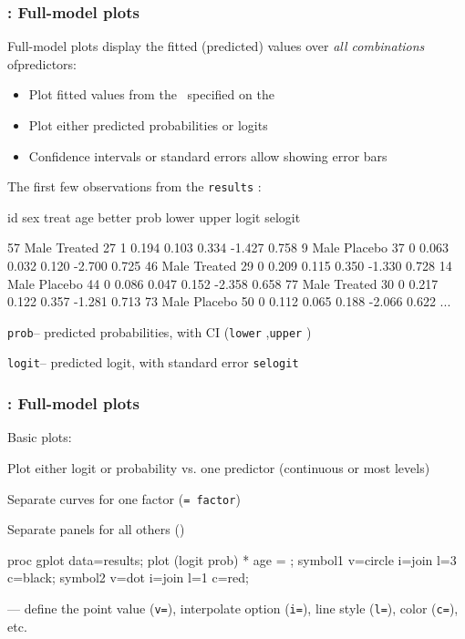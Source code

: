 \begin{frame}[fragile]
  \frametitle{: Full-model plots}
 \alert{Full-model plots} display the fitted (predicted) values over \emph{all combinations}  ofpredictors:
  \begin{itemize}
	\item Plot fitted values from the \Dset\ specified on the 
	\item Plot either predicted probabilities or logits
	\item Confidence intervals or standard errors allow showing error bars
  \end{itemize}
The first few observations from the \texttt{results} \Dset:
\begin{Output}[gobble=2,fontsize=\footnotesize]
   id sex   treat  age better   prob  lower  upper  logit selogit

   57 Male Treated  27    1    0.194  0.103  0.334 -1.427  0.758 
    9 Male Placebo  37    0    0.063  0.032  0.120 -2.700  0.725 
   46 Male Treated  29    0    0.209  0.115  0.350 -1.330  0.728 
   14 Male Placebo  44    0    0.086  0.047  0.152 -2.358  0.658 
   77 Male Treated  30    0    0.217  0.122  0.357 -1.281  0.713 
   73 Male Placebo  50    0    0.112  0.065  0.188 -2.066  0.622 
    ...
\end{Output}
  \begin{itemize*}
	\item \texttt{prob}-- predicted probabilities, with CI (\texttt{lower} ,\texttt{upper} )
	\item \texttt{logit}-- predicted logit, with standard error \texttt{selogit} 
  \end{itemize*}

\end{frame}

\begin{frame}[fragile]
  \frametitle{: Full-model plots}
Basic plots:
  \begin{itemize*}
	\item Plot either logit or probability vs. one predictor (continuous or most levels)
	\item Separate curves for one factor (\texttt{= factor})
	\item Separate panels for all others ()
  \end{itemize*}

\begin{Input}
proc gplot data=results;
   plot (logit prob) * age = ;     
                                 
   symbol1 v=circle i=join l=3 c=black; 
   symbol2 v=dot    i=join l=1 c=red;   
\end{Input}
  \begin{itemize*}
	\item {}--- define the point value (\texttt{v=}), interpolate option (\texttt{i=}), line style (\texttt{l=}), 
	color (\texttt{c=}), etc. 
  \end{itemize*}

\end{frame}

